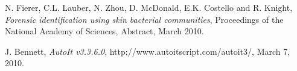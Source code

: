 \documentclass[runningheads]{llncs}
\begin{document}
\begin{thebibliography}{1}

N. Fierer, C.L. Lauber, N. Zhou, D. McDonald, E.K.
Costello and R. Knight, \emph{Forensic identification using skin bacterial
communities}, Proceedings of the National Academy of Sciences, Abstract,
March 2010.


J. Bennett, \emph{AutoIt v3.3.6.0}, http://www.autoitscript.com/autoit3/,
March 7, 2010.











\end{thebibliography}
\end{document}
